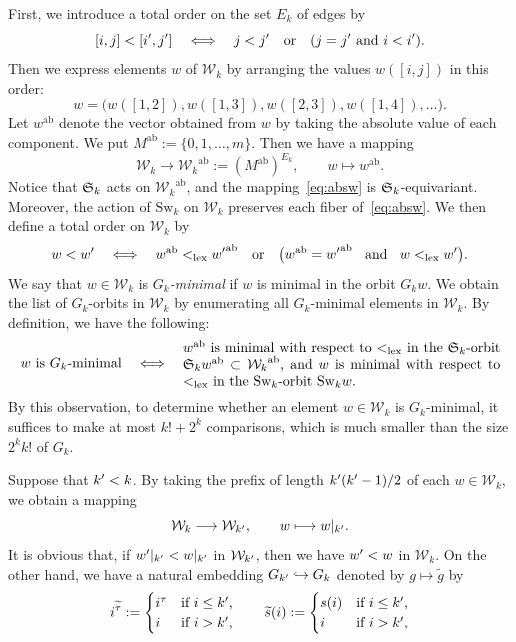 \documentclass{amsart} %
\newcommand{\Sw}{\mathrm{Sw}}
\newcommand{\Wk}{\mathcal{W}_k}
\newcommand{\abs}[1]{ {#1}^{\mathrm{ab}}}
\begin{document}
First, we introduce a total order on the set $E_k$ of edges by
\[
[i,j] < [i^{\prime},j^{\prime}]
\quad\Longleftrightarrow\quad
j < j^{\prime}
\quad\text{or}\quad
(j = j^{\prime} \text{ and } i < i^{\prime}).
\]
Then we express elements $w$ of $\Wk$ by arranging
the values $w([i,j])$ in this order:
\[
w = \bigl(w([1,2]), w([1,3]), w([2,3]), w([1,4]), \ldots \bigr).
\]
Let $\abs{w}$ denote the vector obtained from $w$ by taking
the absolute value of each component.
We put $\abs{M} := \{0,1,\ldots,m\}$.
Then we have a mapping
%
\begin{equation}\label{eq:absw}
\Wk \longrightarrow \abs{\Wk} := (\abs{M})^{E_k},
\qquad
w \longmapsto \abs{w}.
\end{equation}
%
Notice that $\mathord{\mathfrak{S}}_k$ acts on $\abs{\Wk}$, and the mapping~\eqref{eq:absw}
is $\mathord{\mathfrak{S}}_k$-equivariant.
Moreover, the action of $\Sw_k$ on $\Wk$ preserves
each fiber of~\eqref{eq:absw}.
We then define a total order on $\Wk$ by
\[
w < w\sprime
\quad\Longleftrightarrow\quad
\abs{w} <_{\mathrm{lex}} \abs{w\sprime}
\quad\text{or}\quad
\bigl(\abs{w} = \abs{w\sprime} \;\;\text{ and }\;\; w <_{\mathrm{lex}} w\sprime\bigr).
\]
We say that $w\in\Wk $ is \emph{$G_k$-minimal } if $w$ is minimal
in  the orbit $G_k w$.
We obtain the list of $G_k$-orbits in $\Wk$
by enumerating all $G_k$-minimal elements in $\Wk$.
By definition, we have the following:
\[
w \text{ is } G_k\text{-minimal}
\quad\Longleftrightarrow\quad
\parbox{8cm}{
$\abs{w}$ is minimal with respect to $<_{\mathrm{lex}}$ in the $\SSSS_k$-orbit 
$\SSSS_k \abs{w}\subset \abs{\Wk}$, and 
$w$  is minimal  with respect to $<_{\mathrm{lex}}$ in the $ \Sw_k$-orbit $\Sw_k w$.}
\]
By this observation, to determine whether an element
$w \in \Wk$ is $G_k$-minimal, it suffices to make at most
$k! + 2^k$ comparisons, which is much smaller than the size
$2^k k!$ of $G_k$.
\par
Suppose that $k^{\prime} < k$.
By taking the prefix of length $k^{\prime}(k^{\prime}-1)/2$ of each $w \in \Wk$,
we obtain a mapping
\[
\Wk \longrightarrow \mathcal{W}_{k\sprime},
\qquad
w \longmapsto w|_{k\sprime}.
\]
It is obvious that,
if $w^{\prime} |_{k^{\prime}} <w |_{k^{\prime}}$ in $\mathcal{W}_{k^{\prime}}$,
then we have $w^{\prime} <w$ in $\Wk$.
On the other hand,
we have a natural embedding $G_{k^{\prime}} \hookrightarrow G_k$
denoted by $g \mapsto \widetilde{g}$ by 
\[
i\sp{\widetilde{\tau}}:=\begin{cases}
i^{\tau} & \textrm{if $i\le k^{\prime}$,}
\\
i & \textrm{if $i> k^{\prime}$,}
\end{cases}
\qquad
\widetilde{s}(i):=
\begin{cases}
s(i) & \textrm{if $i\le k^{\prime}$,}
\\
i & \textrm{if $i> k^{\prime}$,}
\end{cases}
\]
\end{document}
